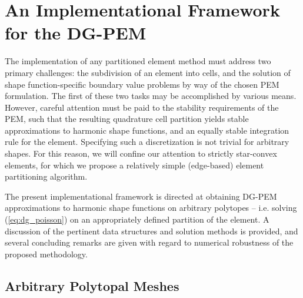 \chapter{An Implementational Framework for the DG-PEM} \label{ch:implementation}
%
The implementation of any partitioned element method must address two primary challenges: the subdivision of an element into cells, and the solution of shape function-specific boundary value problems by way of the chosen PEM formulation. The first of these two tasks may be accomplished by various means. However, careful attention must be paid to the stability requirements of the PEM, such that the resulting quadrature cell partition yields stable approximations to harmonic shape functions, and an equally stable integration rule for the element. Specifying such a discretization is not trivial for arbitrary shapes. For this reason, we will confine our attention to strictly star-convex elements, for which we propose a relatively simple (edge-based) element partitioning algorithm.

The present implementational framework is directed at obtaining DG-PEM approximations to harmonic shape functions on arbitrary polytopes -- i.e. solving (\ref{eq:dg_poisson}) on an appropriately defined partition of the element. A discussion of the pertinent data structures and solution methods is provided, and several concluding remarks are given with regard to numerical robustness of the proposed methodology.

\section{Arbitrary Polytopal Meshes}

